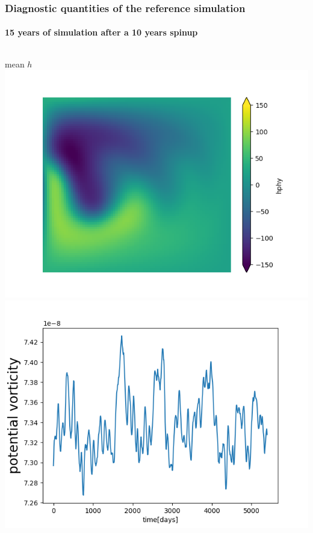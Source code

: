 \documentclass[handout]{beamer}
\begin{document}
\begin{frame}
\frametitle{Diagnostic quantities of the reference simulation}
\framesubtitle{15 years of simulation after a 10 years spinup}
\begin{columns}
\centering
{\footnotesize mean $h$ }\\
\includegraphics[width=\textwidth]{./fig/L3/mean-hphy0.png}\\
\includegraphics[width=\textwidth]{./fig/L3/evol-0--PV.png}


\end{columns}
\end{frame}
\end{document}
